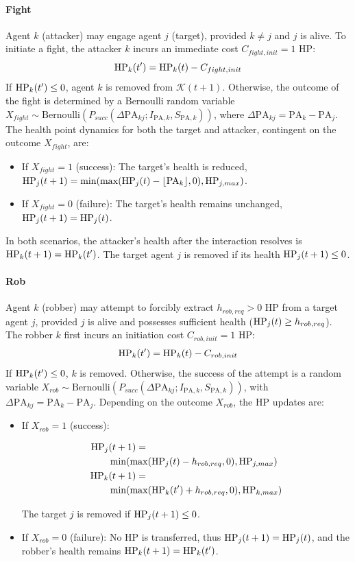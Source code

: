 \paragraph{Fight}
Agent $k$ (attacker) may engage agent $j$ (target), provided $k \neq j$ and $j$ is alive. To initiate a fight, the attacker $k$ incurs an immediate cost $C_{fight,init} = 1$ HP:
$$ \mathrm{HP}_k(t') = \mathrm{HP}_k(t) - C_{fight,init} $$
If $\mathrm{HP}_k(t') \le 0$, agent $k$ is removed from $\mathcal{K}(t+1)$. Otherwise, the outcome of the fight is determined by a Bernoulli random variable $X_{fight} \sim \text{Bernoulli}(P_{succ}(\Delta \mathrm{PA}_{kj}; I_{\mathrm{PA},k}, S_{\mathrm{PA},k}))$, where $\Delta \mathrm{PA}_{kj} = \mathrm{PA}_k - \mathrm{PA}_j$. The health point dynamics for both the target and attacker, contingent on the outcome $X_{fight}$, are:
\begin{itemize}
    \item If $X_{fight}=1$ (success): The target's health is reduced, $\mathrm{HP}_j(t+1) = \min(\max(\mathrm{HP}_j(t) - \lfloor \mathrm{PA}_k \rfloor, 0), \mathrm{HP}_{j,max})$.
    \item If $X_{fight}=0$ (failure): The target's health remains unchanged, $\mathrm{HP}_j(t+1) = \mathrm{HP}_j(t)$.
\end{itemize}
In both scenarios, the attacker's health after the interaction resolves is $\mathrm{HP}_k(t+1) = \mathrm{HP}_k(t')$. The target agent $j$ is removed if its health $\mathrm{HP}_j(t+1) \le 0$.

\paragraph{Rob}
Agent $k$ (robber) may attempt to forcibly extract $h_{rob,req} > 0$ HP from a target agent $j$, provided $j$ is alive and possesses sufficient health ($\mathrm{HP}_j(t) \ge h_{rob,req}$). The robber $k$ first incurs an initiation cost $C_{rob,init} = 1$ HP:
$$ \mathrm{HP}_k(t') = \mathrm{HP}_k(t) - C_{rob,init} $$
If $\mathrm{HP}_k(t') \le 0$, $k$ is removed. Otherwise, the success of the attempt is a random variable $X_{rob} \sim \text{Bernoulli}(P_{succ}(\Delta \mathrm{PA}_{kj}; I_{\mathrm{PA},k}, S_{\mathrm{PA},k}))$, with $\Delta \mathrm{PA}_{kj} = \mathrm{PA}_k - \mathrm{PA}_j$. Depending on the outcome $X_{rob}$, the HP updates are:
\begin{itemize}
    \item If $X_{rob}=1$ (success):
    
    {\small\begin{align*}
        \mathrm{HP}_j&(t+1) = \\&\min(\max(\mathrm{HP}_j(t) - h_{rob,req}, 0), \mathrm{HP}_{j,max}) \\
        \mathrm{HP}_k&(t+1) = \\&\min(\max(\mathrm{HP}_k(t') + h_{rob,req}, 0), \mathrm{HP}_{k,max})
    \end{align*}}
    
    The target $j$ is removed if $\mathrm{HP}_j(t+1) \le 0$.
    \item If $X_{rob}=0$ (failure): No HP is transferred, thus $\mathrm{HP}_j(t+1) = \mathrm{HP}_j(t)$, and the robber's health remains $\mathrm{HP}_k(t+1) = \mathrm{HP}_k(t')$.
\end{itemize}

